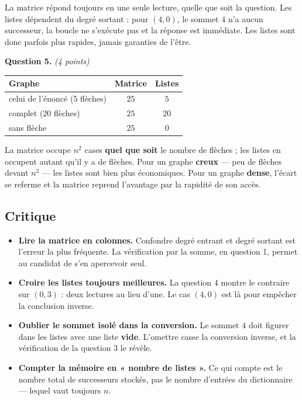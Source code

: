 La matrice répond toujours en une seule lecture, quelle que soit la question.
Les listes dépendent du degré sortant : pour $(4, 0)$, le sommet $4$ n'a aucun
successeur, la boucle ne s'exécute pas et la réponse est immédiate. Les listes
sont donc parfois plus rapides, jamais garanties de l'être.

\medskip
\textbf{Question 5.} \emph{(4 points)}

\begin{center}
\begin{tabular}{|l|c|c|}
\hline
\textbf{Graphe} & \textbf{Matrice} & \textbf{Listes} \\
\hline
celui de l'énoncé ($5$ flèches) & $25$ & $5$ \\
\hline
complet ($20$ flèches) & $25$ & $20$ \\
\hline
sans flèche & $25$ & $0$ \\
\hline
\end{tabular}
\end{center}

La matrice occupe $n^2$ cases \textbf{quel que soit} le nombre de flèches ; les
listes en occupent autant qu'il y a de flèches. Pour un graphe
\textbf{creux} — peu de flèches devant $n^2$ — les listes sont bien plus
économiques. Pour un graphe \textbf{dense}, l'écart se referme et la matrice
reprend l'avantage par la rapidité de son accès.

\subsection*{Critique}

\begin{itemize}
  \item \textbf{Lire la matrice en colonnes.} Confondre degré entrant et degré
    sortant est l'erreur la plus fréquente. La vérification par la somme, en
    question 1, permet au candidat de s'en apercevoir seul.
  \item \textbf{Croire les listes toujours meilleures.} La question 4 montre le
    contraire sur $(0, 3)$ : deux lectures au lieu d'une. Le cas $(4, 0)$ est là
    pour empêcher la conclusion inverse.
  \item \textbf{Oublier le sommet isolé dans la conversion.} Le sommet $4$ doit
    figurer dans les listes avec une liste \textbf{vide}. L'omettre casse la
    conversion inverse, et la vérification de la question 3 le révèle.
  \item \textbf{Compter la mémoire en « nombre de listes ».} Ce qui compte est
    le nombre total de successeurs stockés, pas le nombre d'entrées du
    dictionnaire — lequel vaut toujours $n$.
\end{itemize}

